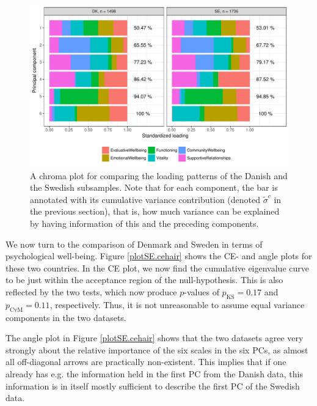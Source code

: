 \documentclass[titlepage,11pt,twoside]{article}
\newcommand{\hl}[1]{\textcolor{magenta}{#1}}
\begin{document}
\begin{figure}
\center
\centerline{\includegraphics[scale = 0.7]{essDKSEpancake.pdf}}
\caption{A chroma plot for comparing the loading patterns of the Danish and the Swedish subsamples. Note that for each component, the bar is annotated with its cumulative variance contribution (denoted $\tilde\sigma^c$ in the previous section), that is, how much variance can be explained by having information of this and the preceding components.}
\label{plotSE.pancake}
\end{figure}


We now turn to the comparison of Denmark and Sweden in terms of psychological well-being. Figure \ref{plotSE.cehair} shows the CE- and angle plots for these two countries. In the CE plot, we now find the cumulative eigenvalue curve to be just within the acceptance region of the null-hypothesis. This is also reflected by the two tests, which now produce $p$-values of $p_\text{KS} = 0.17$ and $p_\text{CvM} = 0.11$, respectively. Thus, it is not unreasonable to assume equal variance components in the two datasets.


The angle plot in Figure \ref{plotSE.cehair} shows that the two datasets agree very strongly about the relative importance of the six scales in the six PCs, as almost all off-diagonal arrows are practically non-existent. This implies that if one already has e.g. the information held in the first PC from the Danish data, this information is in itself mostly sufficient to describe the first PC of the Swedish data.
\end{document}
